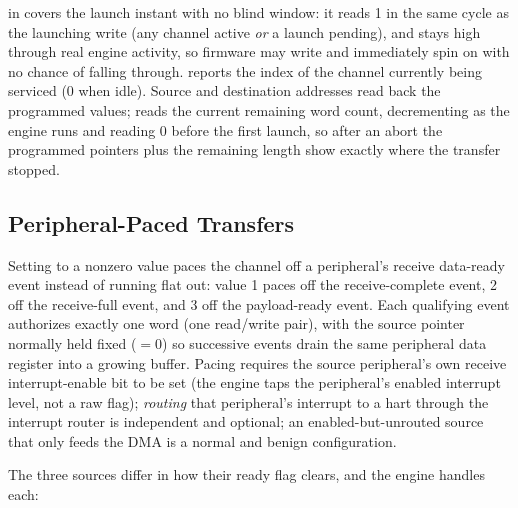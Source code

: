  in  covers the launch instant with no blind window: it reads 1 in the same cycle as the launching  write (any channel active \emph{or} a launch pending), and stays high through real engine activity, so firmware may write  and immediately spin on  with no chance of falling through.  reports the index of the channel currently being serviced (0 when idle). Source and destination addresses read back the programmed values;  reads the current remaining word count, decrementing as the engine runs and reading 0 before the first launch, so after an abort the programmed pointers plus the remaining length show exactly where the transfer stopped.

\subsection{Peripheral-Paced Transfers}

Setting  to a nonzero value paces the channel off a peripheral's receive data-ready event instead of running flat out: value 1 paces off the  receive-complete event, 2 off the  receive-full event, and 3 off the  payload-ready event. Each qualifying event authorizes exactly one word (one read/write pair), with the source pointer normally held fixed ($=0$) so successive events drain the same peripheral data register into a growing buffer. Pacing requires the source peripheral's own receive interrupt-enable bit to be set (the engine taps the peripheral's enabled interrupt level, not a raw flag); \emph{routing} that peripheral's interrupt to a hart through the interrupt router is independent and optional; an enabled-but-unrouted source that only feeds the DMA is a normal and benign configuration.

The three sources differ in how their ready flag clears, and the engine handles each:

